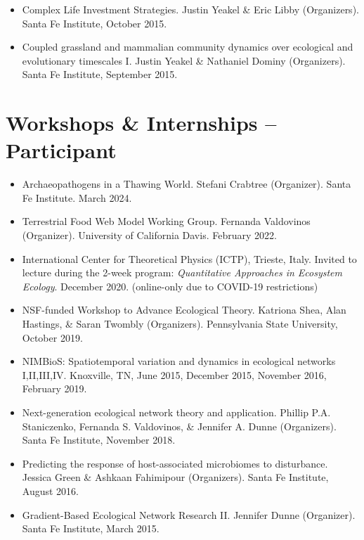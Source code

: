 \documentclass[margin,line,12pt]{res}
\begin{document}
\begin{resume}
\begin{itemize}
\item Complex Life Investment Strategies. Justin Yeakel \& Eric Libby (Organizers). Santa Fe Institute, October 2015.

\item Coupled grassland and mammalian community dynamics over ecological and evolutionary timescales I. Justin Yeakel \& Nathaniel Dominy (Organizers). Santa Fe Institute, September 2015.
\end{itemize}


\section{\sc Workshops \& Internships -- \\ Participant}
\begin{itemize}
\item Archaeopathogens in a Thawing World. Stefani Crabtree (Organizer). Santa Fe Institute. March 2024.

\item Terrestrial Food Web Model Working Group. Fernanda Valdovinos (Organizer). University of California Davis. February 2022.
  
\item International Center for Theoretical Physics (ICTP), Trieste, Italy. Invited to lecture during the 2-week program: \emph{Quantitative Approaches in Ecosystem Ecology}. December 2020. (online-only due to COVID-19 restrictions)

\item NSF-funded Workshop to Advance Ecological Theory. Katriona Shea, Alan Hastings, \& Saran Twombly (Organizers). Pennsylvania State University, October 2019.

\item NIMBioS: Spatiotemporal variation and dynamics in ecological networks I,II,III,IV. Knoxville, TN, June 2015, December 2015, November 2016, February 2019.  

\item Next-generation ecological network theory and application. Phillip P.A. Staniczenko, Fernanda S. Valdovinos, \& Jennifer A. Dunne (Organizers). Santa Fe Institute, November 2018.

\item Predicting the response of host-associated microbiomes to disturbance. Jessica Green \& Ashkaan Fahimipour (Organizers). Santa Fe Institute, August 2016.

\item Gradient-Based Ecological Network Research II. Jennifer Dunne (Organizer). Santa Fe Institute, March 2015.


\end{itemize}
\end{resume}
\end{document}

